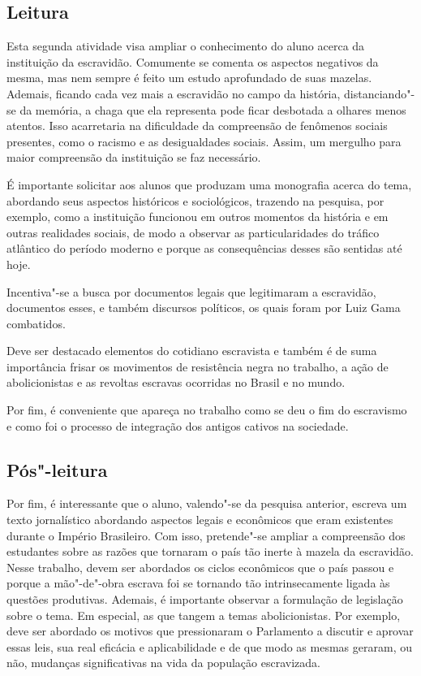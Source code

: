 \documentclass[12pt]{extarticle}
\begin{document}
\subsection{Leitura}


Esta segunda atividade visa ampliar o conhecimento do aluno
acerca da instituição da escravidão. Comumente se comenta os aspectos
negativos da mesma, mas nem sempre é feito um estudo aprofundado de suas
mazelas. Ademais, ficando cada vez mais a escravidão no campo da
história, distanciando"-se da memória, a chaga que ela representa pode
ficar desbotada a olhares menos atentos. Isso acarretaria na dificuldade
da compreensão de fenômenos sociais presentes, como o racismo e as
desigualdades sociais. Assim, um mergulho para maior compreensão da
instituição se faz necessário.

É importante solicitar aos alunos que produzam uma monografia acerca do
tema, abordando seus aspectos históricos e sociológicos, trazendo na
pesquisa, por exemplo, como a instituição funcionou em outros momentos
da história e em outras realidades sociais, de modo a observar as
particularidades do tráfico atlântico do período moderno e porque as
consequências desses são sentidas até hoje.

Incentiva"-se a busca por documentos legais que legitimaram a escravidão,
documentos esses, e também discursos políticos, os quais foram por Luiz
Gama combatidos.

Deve ser destacado elementos do cotidiano escravista e também é de suma
importância frisar os movimentos de resistência negra no trabalho, a
ação de abolicionistas e as revoltas escravas ocorridas no Brasil e no
mundo.

Por fim, é conveniente que apareça no trabalho como se deu o fim do
escravismo e como foi o processo de integração dos antigos cativos na
sociedade.

\subsection{Pós"-leitura}


Por fim, é interessante que o aluno, valendo"-se da pesquisa
anterior, escreva um texto jornalístico abordando aspectos legais e
econômicos que eram existentes durante o Império Brasileiro. Com isso,
pretende"-se ampliar a compreensão dos estudantes sobre as razões que
tornaram o país tão inerte à mazela da escravidão. Nesse trabalho, devem
ser abordados os ciclos econômicos que o país passou e porque a
mão"-de"-obra escrava foi se tornando tão intrinsecamente ligada às
questões produtivas. Ademais, é importante observar a formulação de
legislação sobre o tema. Em especial, as que tangem a temas
abolicionistas. Por exemplo, deve ser abordado os motivos que
pressionaram o Parlamento a discutir e aprovar essas leis, sua real
eficácia e aplicabilidade e de que modo as mesmas geraram, ou não,
mudanças significativas na vida da população escravizada.
\end{document}

